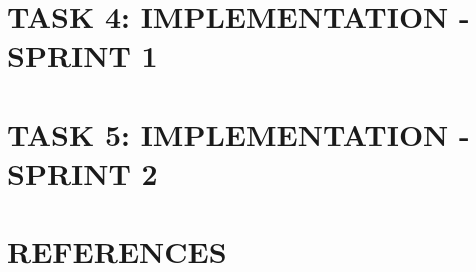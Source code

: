 \documentclass[a4paper]{article}
\theoremstyle{definition}
\begin{document}
\begin{xltabular}{\textwidth}{| c | X | X |}
\hline
\end{xltabular}



\section{TASK 4: IMPLEMENTATION - SPRINT 1}
\newpage
\section{TASK 5: IMPLEMENTATION - SPRINT 2}
\newpage
\section{REFERENCES}
\end{document}
